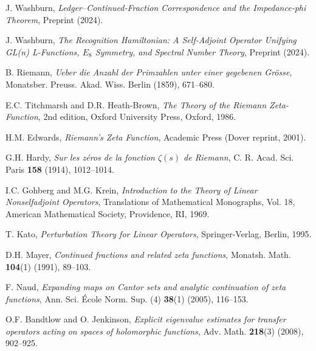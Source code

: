 \documentclass[11pt,a4paper]{article}
\theoremstyle{definition}
\theoremstyle{remark}
\begin{document}
\begin{thebibliography}{99}

J. Washburn,
\emph{Ledger–Continued‑Fraction Correspondence and the Impedance‑phi Theorem},
Preprint (2024).

J. Washburn,
\emph{The Recognition Hamiltonian: A Self-Adjoint Operator Unifying GL(n) L-Functions, $E_8$ Symmetry, and Spectral Number Theory},
Preprint (2024).

B. Riemann,
\emph{Ueber die Anzahl der Primzahlen unter einer gegebenen Grösse},
Monatsber. Preuss. Akad. Wiss. Berlin (1859), 671--680.

E.C. Titchmarsh and D.R. Heath-Brown,
\emph{The Theory of the Riemann Zeta-Function}, 2nd edition,
Oxford University Press, Oxford, 1986.

H.M. Edwards,
\emph{Riemann's Zeta Function},
Academic Press (Dover reprint, 2001).

G.H. Hardy,
\emph{Sur les zéros de la fonction $\zeta(s)$ de Riemann},
C. R. Acad. Sci. Paris \textbf{158} (1914), 1012--1014.

I.C. Gohberg and M.G. Krein,
\emph{Introduction to the Theory of Linear Nonselfadjoint Operators},
Translations of Mathematical Monographs, Vol. 18,
American Mathematical Society, Providence, RI, 1969.

T. Kato,
\emph{Perturbation Theory for Linear Operators},
Springer-Verlag, Berlin, 1995.

D.H. Mayer,
\emph{Continued fractions and related zeta functions},
Monatsh. Math. \textbf{104}(1) (1991), 89--103.

F. Naud,
\emph{Expanding maps on Cantor sets and analytic continuation of zeta functions},
Ann. Sci. École Norm. Sup. (4) \textbf{38}(1) (2005), 116--153.

O.F. Bandtlow and O. Jenkinson,
\emph{Explicit eigenvalue estimates for transfer operators acting on spaces of holomorphic functions},
Adv. Math. \textbf{218}(3) (2008), 902--925.

\end{thebibliography}
\end{document}
